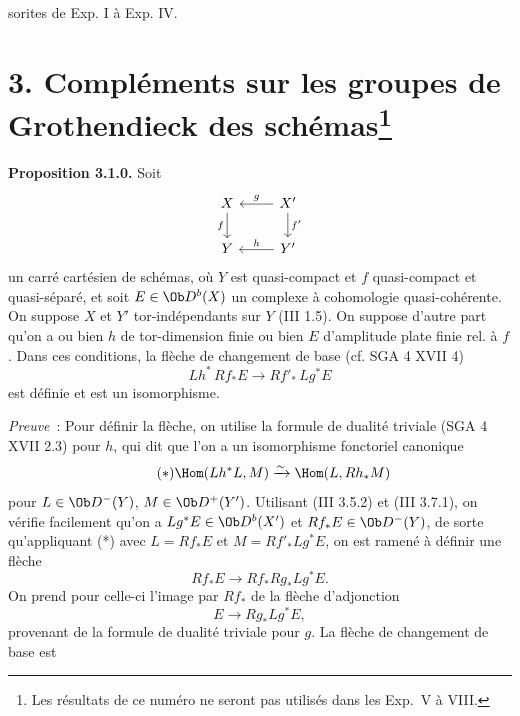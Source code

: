 sorites de Exp. I à Exp. IV.

\section*{3. Compléments sur les groupes de Grothendieck des schémas\protect\footnote{Les résultats de ce numéro ne seront pas utilisés dans les Exp.\ V à VIII.}}

\textbf{Proposition 3.1.0.} Soit
\[
\begin{tikzcd}
X \arrow[d,"f"'] & X' \arrow[l,"g"']\arrow[d,"f'"]\\
Y & Y' \arrow[l,"h"']
\end{tikzcd}
\]
un carré cartésien de schémas, où \(Y\) est quasi-compact et \(f\) quasi-compact et quasi-séparé, et soit \(E\in\Ob D^b(X)\) un complexe à cohomologie quasi-cohérente. On suppose \(X\) et \(Y'\) tor-indépendants sur \(Y\) (III 1.5). On suppose d'autre part qu'on a ou bien \(h\) de tor-dimension finie ou bien \(E\) d'amplitude plate finie rel. à \(f\). Dans ces conditions, la flèche de changement de base (cf. SGA 4 XVII 4)
\[
 Lh^*\,Rf_*E\longrightarrow Rf'_*\,Lg^*E
\]
est définie et est un isomorphisme.

\emph{Preuve}~: Pour définir la flèche, on utilise la formule de dualité triviale (SGA 4 XVII 2.3) pour \(h\), qui dit que l'on a un isomorphisme fonctoriel canonique
\begin{equation}\tag{$*$}
 \Hom(Lh^*L,M)\xrightarrow{\sim}\Hom(L,Rh_*M)
\end{equation}
pour \(L\in\Ob D^-(Y)\), \(M\in\Ob D^+(Y')\). Utilisant (III 3.5.2) et (III 3.7.1), on vérifie facilement qu'on a \(Lg^*E\in\Ob D^b(X')\) et \(Rf_*E\in\Ob D^-(Y)\), de sorte qu'appliquant (*) avec \(L=Rf_*E\) et \(M=Rf'_*Lg^*E\), on est ramené à définir une flèche
\[
 Rf_*E\longrightarrow Rf_*Rg_*Lg^*E.
\]
On prend pour celle-ci l'image par \(Rf_*\) de la flèche d'adjonction
\[
 E\longrightarrow Rg_*Lg^*E,
\]
provenant de la formule de dualité triviale pour \(g\). La flèche de changement de base est
